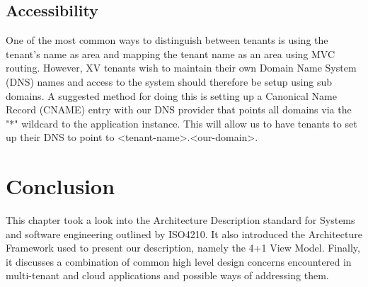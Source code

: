 \subsection{Accessibility}

One of the most common ways to distinguish between tenants is using the tenant's name as area and mapping the tenant name as an area using MVC routing. However, XV tenants wish to maintain their own Domain Name System (DNS) names and access to the system should therefore be setup using sub domains. A suggested method for doing this is setting up a Canonical Name Record (CNAME) entry with our DNS provider that points all domains via the "*" wildcard to the application instance. This will allow us to have tenants to set up their DNS to point to <tenant-name>.<our-domain>.


\section{Conclusion}
This chapter took a look into the Architecture Description standard for Systems and software engineering outlined by ISO4210. It also introduced the Architecture Framework used to present our description, namely the 4+1 View Model. Finally, it discusses a combination of common high level design concerns encountered in multi-tenant and cloud applications and possible ways of addressing them. 
